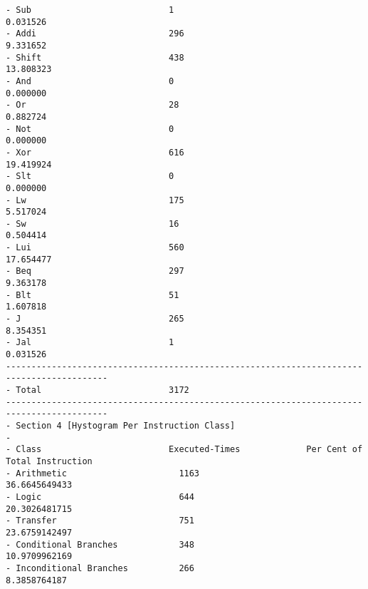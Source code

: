 \begin{verbatim}
- Sub                           1                              0.031526                        
- Addi                          296                            9.331652                        
- Shift                         438                            13.808323                        
- And                           0                              0.000000                        
- Or                            28                             0.882724                        
- Not                           0                              0.000000                        
- Xor                           616                            19.419924                        
- Slt                           0                              0.000000                        
- Lw                            175                            5.517024                        
- Sw                            16                             0.504414                        
- Lui                           560                            17.654477                        
- Beq                           297                            9.363178                        
- Blt                           51                             1.607818                        
- J                             265                            8.354351                        
- Jal                           1                              0.031526                        
------------------------------------------------------------------------------------------
- Total                         3172                                                          
------------------------------------------------------------------------------------------
- Section 4 [Hystogram Per Instruction Class]                                                   
-                                                                                               
- Class                         Executed-Times             Per Cent of Total Instruction  
- Arithmetic                      1163                         36.6645649433                              
- Logic                           644                          20.3026481715                              
- Transfer                        751                          23.6759142497                              
- Conditional Branches            348                          10.9709962169                              
- Inconditional Branches          266                          8.3858764187                              
\end{verbatim}

